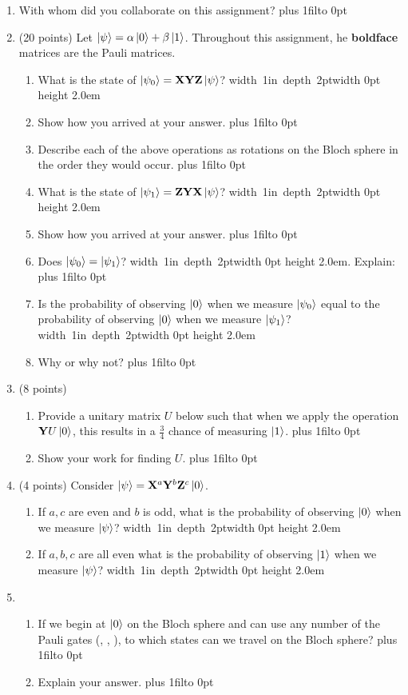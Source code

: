 \documentclass[12pt]{article}
\newcommand{\Blank}{\mbox{\hskip 4pt\vrule width 1in depth 2pt}\vrule width 0pt height 2.0em}
\def\DefaultSpace{1in}
\newcommand{\LeaveSpace}[1][\DefaultSpace]{%
\vskip #1 plus 1fil\relax\hbox to 0pt{\hss} %
}
\begin{document}
\begin{enumerate}[font=\bfseries]
\item With whom did you collaborate on this assignment?
    \LeaveSpace{}
    \item (20 points) Let $\ket{\psi} = \alpha\ket{0} + \beta\ket{1}$. Throughout this assignment, he {\bf boldface} matrices are the Pauli matrices.
    \begin{enumerate}[label=\theenumi.\arabic*]
        \item What is the state of $\ket{\psi_0} = \mathbf{X}\mathbf{Y}\mathbf{Z}\ket{\psi}$? \Blank{}
        \item Show how you arrived at your answer. \LeaveSpace[0.7in]
        \item Describe each of the above operations as rotations on the Bloch sphere in the order they would occur.\LeaveSpace{}
        \item What is the state of $\ket{\psi_1} = \mathbf{Z}\mathbf{Y}\mathbf{X}\ket{\psi}$? \Blank{}
        \item Show how you arrived at your answer. \LeaveSpace[0.6in]
        \item Does $\ket{\psi_0} = \ket{\psi_1}$? \Blank{}.  Explain:\LeaveSpace{}
        \item Is the probability of observing $\ket{0}$ when we measure $\ket{\psi_0}$ equal to the probability of observing $\ket{0}$ when we measure $\ket{\psi_1}$?\Blank{}
        \item Why or why not? \LeaveSpace{}
    \end{enumerate}
    \item (8 points) 
    \begin{enumerate}[label=\theenumi.\arabic*]
    \item Provide a unitary matrix $U$ below such that when we apply the operation $\mathbf{Y}U\ket{0}$, this results in a $\frac{3}{4}$ chance of measuring $\ket{1}$. \LeaveSpace{}
    \item Show your work for finding $U$. \LeaveSpace[2.0in]
    \end{enumerate}
    \item (4 points) Consider $\ket{\psi} = \mathbf{X}^a\mathbf{Y}^b\mathbf{Z}^c\ket{0}$.
    \begin{enumerate}[label=\theenumi.\arabic*]
        \item If $a,c$ are even and $b$ is odd, what is the probability of observing $\ket{0}$ when we measure $\ket{\psi}$? \Blank{}
        \item If $a,b,c$ are all even what is the probability of observing $\ket{1}$ when we measure $\ket{\psi}$? \Blank{}
    \end{enumerate}
    \item {}
    \begin{enumerate}[label=\theenumi.\arabic*] \item {} If we begin at $\ket{0}$ on the Bloch sphere and can use any number of the Pauli gates (\PauliX{}, \PauliY{}, \PauliZ{}), to which states can we travel on the Bloch sphere? \LeaveSpace{}
    \item {} Explain your answer. 
    \LeaveSpace{}
    

\end{enumerate}
\end{enumerate}
\end{document}
